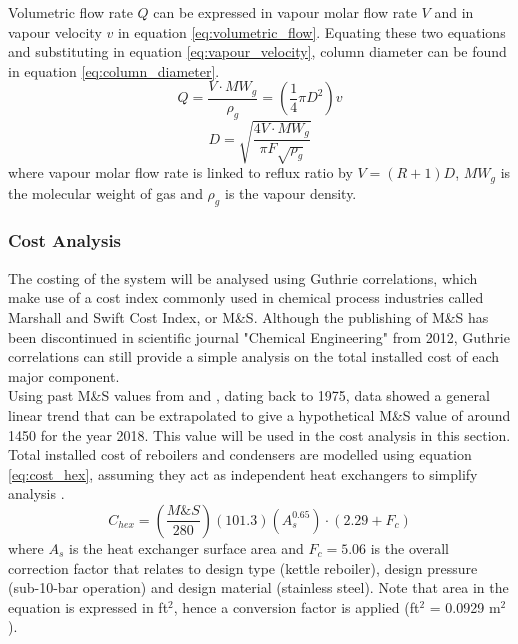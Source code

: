 \documentclass[11pt,oneside]{article}
\begin{document}
		\noindent Volumetric flow rate $Q$ can be expressed in vapour molar flow rate $V$ and in vapour velocity $v$ in equation \ref{eq:volumetric_flow}. Equating these two equations and substituting in equation \ref{eq:vapour_velocity}, column diameter can be found in equation \ref{eq:column_diameter}.
		\begin{equation}
		    Q = \frac{V \cdot MW_g}{\rho_g} = \left(\frac{1}{4}\pi D^2\right)v
		    \label{eq:volumetric_flow}
		\end{equation}
		\begin{equation}
		    D = \sqrt{\frac{4V\cdot MW_g}{\pi F \sqrt{\rho_g}}}
		    \label{eq:column_diameter}
		\end{equation}
		where vapour molar flow rate is linked to reflux ratio by $V = (R+1)D$, $MW_g$ is the molecular weight of gas and $\rho_g$ is the vapour density.
	\subsubsection{Cost Analysis} \noindent
	The costing of the system will be analysed using Guthrie correlations, which make use of a cost index commonly used in chemical process industries called Marshall and Swift Cost Index, or M\&S. Although the publishing of M\&S has been discontinued in scientific journal "Chemical Engineering" from 2012, Guthrie correlations can still provide a simple analysis on the total installed cost of each major component. \\
	Using past M\&S values from \cite{peters1991} and \cite{marshall_swift}, dating back to 1975, data showed a general linear trend that can be extrapolated to give a hypothetical M\&S value of around 1450 for the year 2018. This value will be used in the cost analysis in this section. \\
	
    \noindent Total installed cost of reboilers and condensers are modelled using equation \ref{eq:cost_hex}, assuming they act as independent heat exchangers to simplify analysis \citep{douglas1988}.
    \begin{equation}
	    C_{hex} = \left(\frac{M\&S}{280}\right)\left(101.3\right)\left(A_s^{0.65}\right)\cdot (2.29 + F_c)
	    \label{eq:cost_hex}
	\end{equation}
	where $A_s$ is the heat exchanger surface area and $F_c = 5.06$ is the overall correction factor that relates to design type (kettle reboiler), design pressure (sub-10-bar operation) and design material (stainless steel). Note that area in the equation is expressed in ft$^2$, hence a conversion factor is applied (ft$^2$ = 0.0929 m$^2$). \\
	
\end{document}

